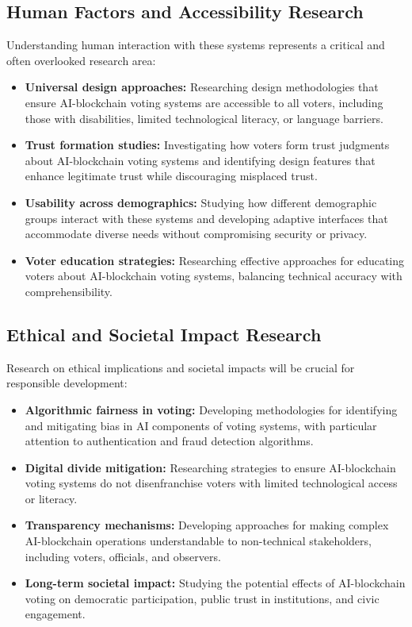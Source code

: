 \documentclass[conference]{IEEEtran}
\begin{document}
\subsection{Human Factors and Accessibility Research}
Understanding human interaction with these systems represents a critical and often overlooked research area:

\begin{itemize}
    \item \textbf{Universal design approaches:} Researching design methodologies that ensure AI-blockchain voting systems are accessible to all voters, including those with disabilities, limited technological literacy, or language barriers.
    
    \item \textbf{Trust formation studies:} Investigating how voters form trust judgments about AI-blockchain voting systems and identifying design features that enhance legitimate trust while discouraging misplaced trust.
    
    \item \textbf{Usability across demographics:} Studying how different demographic groups interact with these systems and developing adaptive interfaces that accommodate diverse needs without compromising security or privacy.
    
    \item \textbf{Voter education strategies:} Researching effective approaches for educating voters about AI-blockchain voting systems, balancing technical accuracy with comprehensibility.
\end{itemize}

\subsection{Ethical and Societal Impact Research}
Research on ethical implications and societal impacts will be crucial for responsible development:

\begin{itemize}
    \item \textbf{Algorithmic fairness in voting:} Developing methodologies for identifying and mitigating bias in AI components of voting systems, with particular attention to authentication and fraud detection algorithms.
    
    \item \textbf{Digital divide mitigation:} Researching strategies to ensure AI-blockchain voting systems do not disenfranchise voters with limited technological access or literacy.
    
    \item \textbf{Transparency mechanisms:} Developing approaches for making complex AI-blockchain operations understandable to non-technical stakeholders, including voters, officials, and observers.
    
    \item \textbf{Long-term societal impact:} Studying the potential effects of AI-blockchain voting on democratic participation, public trust in institutions, and civic engagement.
\end{itemize}
\end{document}
